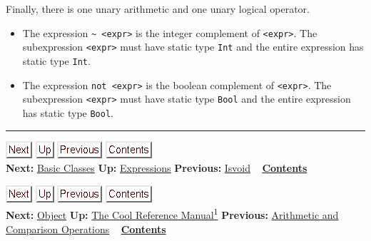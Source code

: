 \documentclass[]{article}
\begin{document}
Finally, there is one unary arithmetic and one unary logical operator.

\begin{itemize}
\itemsep1pt\parskip0pt
\item
  The expression
  \texttt{\textasciitilde{} \textless{}expr\textgreater{}} is the
  integer complement of \texttt{\textless{}expr\textgreater{}}. The
  subexpression \texttt{\textless{}expr\textgreater{}} must have static
  type \texttt{Int} and the entire expression has static type
  \texttt{Int}.
\item
  The expression \texttt{not \textless{}expr\textgreater{}} is the
  boolean complement of \texttt{\textless{}expr\textgreater{}}. The
  subexpression \texttt{\textless{}expr\textgreater{}} must have static
  type \texttt{Bool} and the entire expression has static type
  \texttt{Bool}.
\end{itemize}

\begin{center}\rule{3in}{0.4pt}\end{center}

\href{node26.html}{\includegraphics{next.png}}
\href{node13.html}{\includegraphics{up.png}}
\href{node24.html}{\includegraphics{prev.png}}
\href{node1.html}{\includegraphics{contents.png}} \\ \textbf{Next:}
\href{node26.html}{Basic Classes} \textbf{Up:}
\href{node13.html}{Expressions} \textbf{Previous:}
\href{node24.html}{Isvoid} ~ \textbf{\href{node1.html}{Contents}}

\href{node27.html}{\includegraphics{next.png}}
\href{cool-manual.html}{\includegraphics{up.png}}
\href{node25.html}{\includegraphics{prev.png}}
\href{node1.html}{\includegraphics{contents.png}} \\ \textbf{Next:}
\href{node27.html}{Object} \textbf{Up:} \href{cool-manual.html}{The Cool
Reference Manual\textsuperscript{1}} \textbf{Previous:}
\href{node25.html}{Arithmetic and Comparison Operations} ~
\textbf{\href{node1.html}{Contents}} \\ \\
\end{document}
